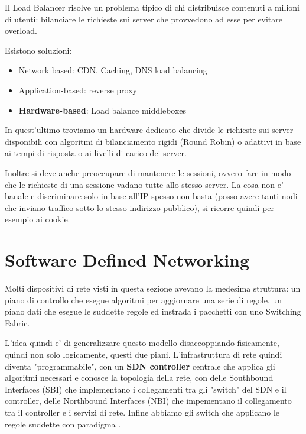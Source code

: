 Il Load Balancer risolve un problema tipico di chi distribuisce contenuti a milioni di utenti: bilanciare le richieste sui server che provvedono ad esse per evitare overload.

Esistono soluzioni:
\begin{itemize}
    \item Network based: CDN, Caching, DNS load balancing
    \item Application-based: reverse proxy
    \item \textbf{Hardware-based}: Load balance middleboxes
\end{itemize}

In quest'ultimo troviamo un hardware dedicato che divide le richieste sui server disponibili con algoritmi di bilanciamento rigidi (Round Robin) o adattivi in base ai tempi di risposta o ai livelli di carico dei server.

Inoltre si deve anche preoccupare di mantenere le sessioni, ovvero fare in modo che le richieste di una sessione vadano tutte allo stesso server. La cosa non e' banale e discriminare solo in base all'IP spesso non basta (posso avere tanti nodi che inviano traffico sotto lo stesso indirizzo pubblico), si ricorre quindi per esempio ai cookie.


\section{Software Defined Networking}

Molti dispositivi di rete visti in questa sezione avevano la medesima struttura: un piano di controllo che esegue algoritmi per aggiornare una serie di regole, un piano dati che esegue le suddette regole ed instrada i pacchetti con uno Switching Fabric.


L'idea quindi e' di generalizzare questo modello disaccoppiando fisicamente, quindi non solo logicamente, questi due piani. L'infrastruttura di rete quindi diventa "programmabile", con un \textbf{SDN controller} centrale che applica gli algoritmi necessari e conosce la topologia della rete, con delle Southbound Interfaces (SBI) che implementano i collegamenti tra gli "switch" del SDN e il controller, delle Northbound Interfaces (NBI) che impementano il collegamento tra il controller e i servizi di rete. Infine abbiamo gli switch che applicano le regole suddette con paradigma .

